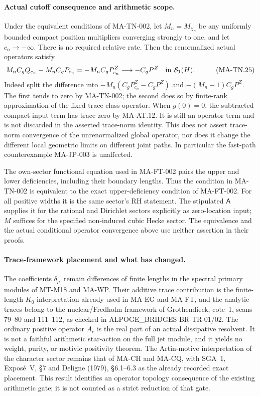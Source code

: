 \paragraph{Actual cutoff consequence and arithmetic scope.}
Under the equivalent conditions of MA-TN-002, let
\(M_n=M_{\chi_n}\) be any uniformly bounded compact
position multipliers converging strongly to one,
and let \(c_n\to-\infty\).  There is no required relative
rate.  Then the renormalized actual operators satisfy
\[
 \begin{aligned}
 M_nC_gQ_{c_n}-M_nC_gP_{c_n}
      &=-M_nC_gP_{c_n}^Z
                  \longrightarrow-C_gP^Z
                              \quad\hbox{in }\mathcal S_1(H).
 \end{aligned}
 \tag{MA-TN.25}
\]
Indeed split the difference into
\(-M_n(C_gP_{c_n}^Z-C_gP^Z)\) and
\(-(M_n-1)C_gP^Z\).  The first tends to zero by
MA-TN-002; the second does so by finite-rank approximation
of the fixed trace-class operator.  When \(g(0)=0\),
the subtracted compact-input term has trace zero
by MA-AT.12.  It is still an operator term and is not
discarded in the asserted trace-norm identity.
This does not assert trace-norm convergence of the
unrenormalized global operator, nor does it change the
different local geometric limits on different joint paths.
In particular the fast-path counterexample MA-JP-003
is unaffected.

The own-sector functional equation used in MA-FT-002
pairs the upper and lower deficiencies, including their
boundary lengths.  Thus the condition in MA-TN-002 is
equivalent to the exact upper-deficiency condition of
MA-FT-002.  For all positive widths it is the same sector's
RH statement.  The stipulated \(\mathsf A\) supplies it
for the rational and Dirichlet sectors explicitly as
zero-location input; \(M\) suffices for the specified
non-induced cubic Hecke sector.  The equivalence and
the actual conditional operator convergence above use
neither assertion in their proofs.

\paragraph{Trace-framework placement and what has changed.}
The coefficients \(\delta_\rho^-\) remain differences of
finite lengths in the spectral primary modules of MT-M18
and MA-WP.  Their additive trace contribution is the
finite-length \(K_0\) interpretation already used in
MA-EG and MA-FT, and the analytic traces belong to the
nuclear/Fredholm framework of Grothendieck, cote~1,
scans 79--80 and 111--112, as checked in
ALPOGE\_BRIDGES BR-TR-01/02.
The ordinary positive operator \(A_c\) is the real part
of an actual dissipative resolvent.  It is not a
faithful arithmetic star-action on the full jet module,
and it yields no weight, purity, or motivic positivity
theorem.  The Artin-motive interpretation of the character
sector remains that of MA-CH and MA-CQ, with SGA~1,
Expos\'e~V, \S7 and Deligne (1979), \S6.1--6.3 as the
already recorded exact placement.
This result identifies an operator topology consequence
of the existing arithmetic gate; it is not counted as a
strict reduction of that gate.
